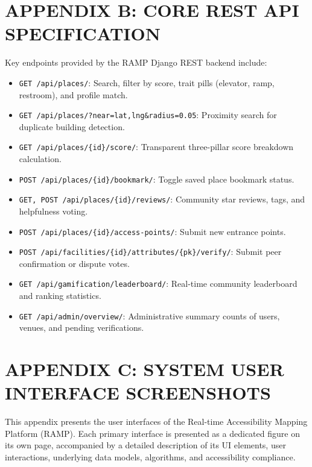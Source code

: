\documentclass[12pt,a4paper]{report}
\begin{document}
\section*{APPENDIX B: CORE REST API SPECIFICATION}
Key endpoints provided by the RAMP Django REST backend include:
\begin{itemize}
    \item \texttt{GET /api/places/}: Search, filter by score, trait pills (elevator, ramp, restroom), and profile match.
    \item \texttt{GET /api/places/?near=lat,lng\&radius=0.05}: Proximity search for duplicate building detection.
    \item \texttt{GET /api/places/\{id\}/score/}: Transparent three-pillar score breakdown calculation.
    \item \texttt{POST /api/places/\{id\}/bookmark/}: Toggle saved place bookmark status.
    \item \texttt{GET, POST /api/places/\{id\}/reviews/}: Community star reviews, tags, and helpfulness voting.
    \item \texttt{POST /api/places/\{id\}/access-points/}: Submit new entrance points.
    \item \texttt{POST /api/facilities/\{id\}/attributes/\{pk\}/verify/}: Submit peer confirmation or dispute votes.
    \item \texttt{GET /api/gamification/leaderboard/}: Real-time community leaderboard and ranking statistics.
    \item \texttt{GET /api/admin/overview/}: Administrative summary counts of users, venues, and pending verifications.
\end{itemize}

\newpage
\section*{APPENDIX C: SYSTEM USER INTERFACE SCREENSHOTS}
This appendix presents the user interfaces of the Real-time Accessibility Mapping Platform (RAMP). Each primary interface is presented as a dedicated figure on its own page, accompanied by a detailed description of its UI elements, user interactions, underlying data models, algorithms, and accessibility compliance.
\end{document}
